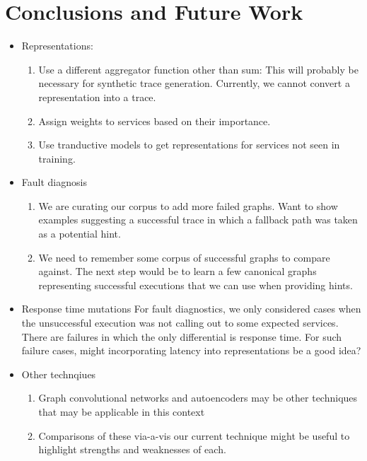\section{Conclusions and Future Work}
\begin{itemize}
\item Representations:
    \begin{enumerate}
    \item Use a different aggregator function other than sum:
    This will probably be necessary for synthetic trace generation. Currently, we cannot convert a representation into a trace. 
    \item Assign weights to services based on their importance.
    \item Use tranductive models to get representations for services not seen in training.
    \end{enumerate}
\item Fault diagnosis
    \begin{enumerate}
    \item We are curating our corpus to add more failed graphs. Want to show examples suggesting a successful trace in which a fallback path was taken as a potential hint.
    \item We need to remember some corpus of successful graphs to compare against. The next step would be to learn a few canonical graphs representing successful executions that we can use when providing hints.
    \end{enumerate}
\item Response time mutations
For fault diagnostics, we only considered cases when the unsuccessful execution was not calling out to some expected services. There are failures in which the only differential is response time. For such failure cases, might incorporating latency into representations be a good idea?
\item Other technqiues
    \begin{enumerate}
    \item Graph convolutional networks and autoencoders may be other techniques that may be applicable in this context
    \item Comparisons of these via-a-vis our current technique might be useful to highlight strengths and weaknesses of each.
    \end{enumerate}
\end{itemize}


